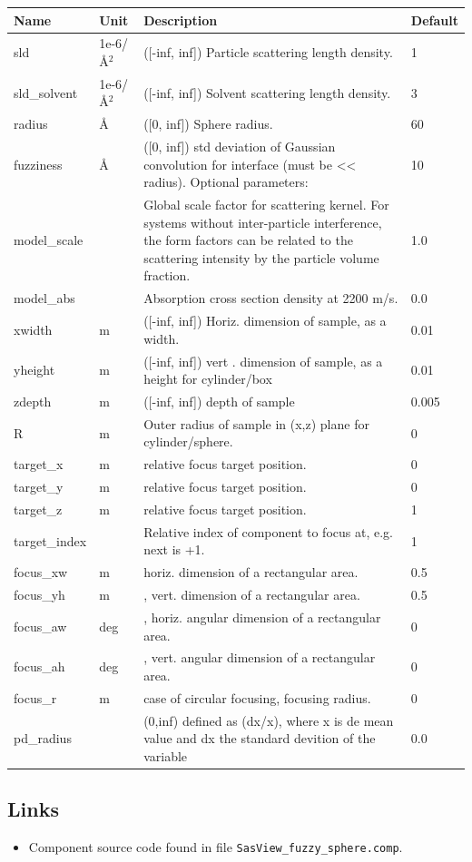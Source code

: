 \begin{longtable}{p{}p{}p{}p{}}
\toprule
\textbf{Name} & \textbf{Unit} & \textbf{Description} & \textbf{Default} \\
\midrule
\endhead
sld & 1e-6/\AA{}$^{2}$ & ([-inf, inf]) Particle scattering length density. & 1 \\
sld\_solvent & 1e-6/\AA{}$^{2}$ & ([-inf, inf]) Solvent scattering length density. & 3 \\
radius & \AA{} & ([0, inf]) Sphere radius. & 60 \\
fuzziness & \AA{} & ([0, inf]) std deviation of Gaussian convolution for interface (must be \textless{}\textless{} radius). Optional parameters: & 10 \\
model\_scale &   & Global scale factor for scattering kernel. For systems without inter-particle interference, the form factors can be related to the scattering intensity by the particle volume fraction. & 1.0 \\
model\_abs &   & Absorption cross section density at 2200 m/s. & 0.0 \\
xwidth & m & ([-inf, inf]) Horiz. dimension of sample, as a width. & 0.01 \\
yheight & m & ([-inf, inf]) vert . dimension of sample, as a height for cylinder/box & 0.01 \\
zdepth & m & ([-inf, inf]) depth of sample & 0.005 \\
R & m & Outer radius of sample in (x,z) plane for cylinder/sphere. & 0 \\
target\_x & m & relative focus target position. & 0 \\
target\_y & m & relative focus target position. & 0 \\
target\_z & m & relative focus target position. & 1 \\
target\_index &   & Relative index of component to focus at, e.g. next is +1. & 1 \\
focus\_xw & m & horiz. dimension of a rectangular area. & 0.5 \\
focus\_yh & m & , vert. dimension of a rectangular area. & 0.5 \\
focus\_aw & deg & , horiz. angular dimension of a rectangular area. & 0 \\
focus\_ah & deg & , vert. angular dimension of a rectangular area. & 0 \\
focus\_r & m & case of circular focusing, focusing radius. & 0 \\
pd\_radius &  & (0,inf) defined as (dx/x), where x is de mean value and dx the standard devition of the variable & 0.0 \\
\bottomrule
\end{longtable}

\subsection*{Links}
\begin{itemize}
  \item Component source code found in file \texttt{SasView\_fuzzy\_sphere.comp}.
\end{itemize}
